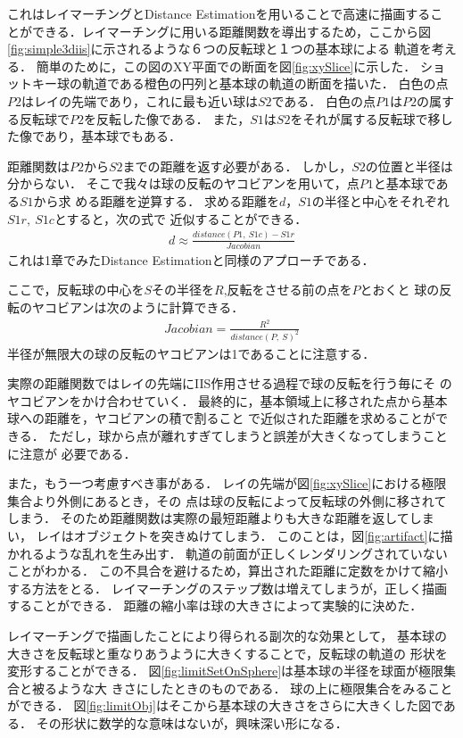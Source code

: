 これはレイマーチングとDistance Estimationを用いることで高速に描画するこ
とができる．レイマーチングに用いる距離関数を導出するため，ここから図
\ref{fig:simple3diis}に示されるような６つの反転球と１つの基本球による
軌道を考える．
簡単のために，この図のXY平面での断面を図\ref{fig:xySlice}に示した．
ショットキー球の軌道である橙色の円列と基本球の軌道の断面を描いた．
白色の点$P2$はレイの先端であり，これに最も近い球は$S2$である．
白色の点$P1$は$P2$の属する反転球で$P2$を反転した像である．
また，$S1$は$S2$をそれが属する反転球で移した像であり，基本球でもある．

距離関数は$P2$から$S2$までの距離を返す必要がある．
しかし，$S2$の位置と半径は分からない．
そこで我々は球の反転のヤコビアンを用いて，点$P1$と基本球である$S1$から求
める距離を逆算する．
求める距離を$d$，$S1$の半径と中心をそれぞれ$S1r,~S1c$とすると，次の式で
近似することができる．
\begin{align*}
 d \approx \frac{distance(P1,~S1c) - S1r}{Jacobian}
\end{align*}
これは1章でみたDistance Estimationと同様のアプローチである．

ここで，反転球の中心を$S$その半径を$R$,反転をさせる前の点を$P$とおくと
球の反転のヤコビアンは次のように計算できる．
\begin{align*}
 Jacobian = \frac{R^2}{distance(P,~S)^2}
\end{align*}
半径が無限大の球の反転のヤコビアンは1であることに注意する．

実際の距離関数ではレイの先端にIIS作用させる過程で球の反転を行う毎にそ
のヤコビアンをかけ合わせていく．
最終的に，基本領域上に移された点から基本球への距離を，ヤコビアンの積で割ること
で近似された距離を求めることができる．
ただし，球から点が離れすぎてしまうと誤差が大きくなってしまうことに注意が
必要である．

また，もう一つ考慮すべき事がある．
レイの先端が図\ref{fig:xySlice}における極限集合より外側にあるとき，その
点は球の反転によって反転球の外側に移されてしまう．
そのため距離関数は実際の最短距離よりも大きな距離を返してしまい，
レイはオブジェクトを突きぬけてしまう．
このことは，図\ref{fig:artifact}に描かれるような乱れを生み出す．
軌道の前面が正しくレンダリングされていないことがわかる．
この不具合を避けるため，算出された距離に定数をかけて縮小する方法をとる．
レイマーチングのステップ数は増えてしまうが，正しく描画することができる．
距離の縮小率は球の大きさによって実験的に決めた．

レイマーチングで描画したことにより得られる副次的な効果として，
基本球の大きさを反転球と重なりあうように大きくすることで，反転球の軌道の
形状を変形することができる．
図\ref{fig:limitSetOnSphere}は基本球の半径を球面が極限集合と被るような大
きさにしたときのものである．
球の上に極限集合をみることができる．
図\ref{fig:limitObj}はそこから基本球の大きさをさらに大きくした図である．
その形状に数学的な意味はないが，興味深い形になる．

